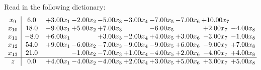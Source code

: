 \documentclass[9pt]{article}
\begin{document}
Read in the following dictionary:
\[\begin{array}{c| c c@{\hskip 2pt} c@{\hskip 2pt} c@{\hskip 2pt} c@{\hskip 2pt} c@{\hskip 2pt} c@{\hskip 2pt} c@{\hskip 2pt} c@{\hskip 2pt} }
 x_{9}   &  6.0 & +  3.00 x_{1} & -2.00 x_{2} & -5.00 x_{3} & -3.00 x_{4} & -7.00 x_{5} & -7.00 x_{6} & + 10.00 x_{7} &   \\
 x_{10}   &  18.0 & -9.00 x_{1} & +  5.00 x_{2} & +  7.00 x_{3} &   & -6.00 x_{5} &   & +  2.00 x_{7} & -4.00 x_{8}\\
 x_{11}   &  -8.0 & +  6.00 x_{1} &   & +  3.00 x_{3} & -2.00 x_{4} & +  4.00 x_{5} & +  3.00 x_{6} & -3.00 x_{7} & -1.00 x_{8}\\
 x_{12}   &  54.0 & +  9.00 x_{1} & -6.00 x_{2} & -7.00 x_{3} & -9.00 x_{4} & -9.00 x_{5} & +  6.00 x_{6} & -9.00 x_{7} & +  7.00 x_{8}\\
 x_{13}   &  21.0  &   & -1.00 x_{2} & -7.00 x_{3} & +  1.00 x_{4} & -4.00 x_{5} & +  2.00 x_{6} & -4.00 x_{7} & +  4.00 x_{8}\\
\hline
z    &  0.0 & +  4.00 x_{1} & -4.00 x_{2} & -4.00 x_{3} & +  2.00 x_{4} & +  3.00 x_{5} & +  5.00 x_{6} & +  3.00 x_{7} & +  5.00 x_{8}\\
\end{array}\]
\end{document}
